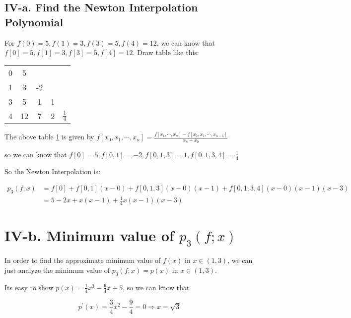\documentclass[a4paper]{article}
\begin{document}
\subsection*{IV-a. Find the Newton Interpolation Polynomial}

For $f(0)=5, f(1)=3, f(3)=5, f(4)=12$, we can know that $f[0]=5, f[1]=3, f[3]=5, f[4]=12$. Draw table like this:

\begin{table}[H]
  \centering
  \begin{tabular}{c|cccc}
    0 & 5  &    &   &\\
    1 & 3  & -2 &   &\\
    3 & 5  & 1  & 1 &\\
    4 & 12 & 7  & 2 & $\frac{1}{4}$\\
  \end{tabular}
  \label{tabel::IV-A.tabel1}
\end{table}

The above table \ref{tabel::IV-A.tabel1} is given by $f[x_0,x_1,\cdots,x_n] = \frac{f[x_1,\cdots,x_n] - f[x_0,x_1,\cdots,x_{n-1}]}{x_n - x_0}$ 

so we can know that $f[0]=5, f[0,1]=-2, f[0,1,3]=1, f[0,1,3,4]=\frac{1}{4}$

So the Newton Interpolation is:

\begin{equation}
  \begin{aligned}
    p_3(f;x) &= f[0] + f[0,1](x-0) + f[0,1,3](x-0)(x-1) + f[0,1,3,4](x-0)(x-1)(x-3) \\
             &= 5 - 2x + x(x-1) + \frac{1}{4}x(x-1)(x-3)
  \end{aligned}
\end{equation}

\section*{IV-b. Minimum value of $p_3(f;x)$}

In order to find the approximate minimum value of $f(x)$ in $x\in (1,3)$, we can just analyze the minimum value of $p_3(f;x) = p(x)$ in $x\in(1,3)$.

Its easy to show $p(x) = \frac{1}{4}x^3 - \frac{9}{4}x + 5$, so we can know that 

\begin{equation}
  p^{\prime}(x) = \frac{3}{4}x^2 - \frac{9}{4} = 0 \Rightarrow x = \sqrt{3}
\end{equation}
\end{document}
